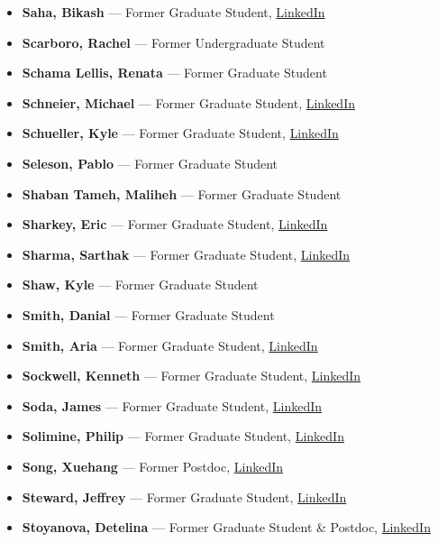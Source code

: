 \documentclass[12pt,a4paper]{article}
\begin{document}
\begin{itemize}
    \item \textbf{Saha, Bikash} --- Former Graduate Student, \href{https://www.linkedin.com/in/bikash-saha-2a3a5530/}{LinkedIn}
    \item \textbf{Scarboro, Rachel} --- Former Undergraduate Student
    \item \textbf{Schama Lellis, Renata} --- Former Graduate Student
    \item \textbf{Schneier, Michael} --- Former Graduate Student, \href{https://www.linkedin.com/in/michael-schneier-51610497/}{LinkedIn}
    \item \textbf{Schueller, Kyle} --- Former Graduate Student, \href{https://www.linkedin.com/in/kyle-schueller-071a9916b/}{LinkedIn}
    \item \textbf{Seleson, Pablo} --- Former Graduate Student
    \item \textbf{Shaban Tameh, Maliheh} --- Former Graduate Student
    \item \textbf{Sharkey, Eric} --- Former Graduate Student, \href{https://www.linkedin.com/in/eric-sharkey-35b80916a/}{LinkedIn}
    \item \textbf{Sharma, Sarthak} --- Former Graduate Student, \href{https://www.linkedin.com/in/sarthak-sharma-636307135/}{LinkedIn}
    \item \textbf{Shaw, Kyle} --- Former Graduate Student
    \item \textbf{Smith, Danial} --- Former Graduate Student
    \item \textbf{Smith, Aria} --- Former Graduate Student, \href{https://www.linkedin.com/in/aria-g-smith-66385a53/}{LinkedIn}
    \item \textbf{Sockwell, Kenneth} --- Former Graduate Student, \href{https://www.linkedin.com/in/kenneth-sockwell-321151a1/}{LinkedIn}
    \item \textbf{Soda, James} --- Former Graduate Student, \href{https://www.linkedin.com/in/james-soda-2a781b83/}{LinkedIn}
    \item \textbf{Solimine, Philip} --- Former Graduate Student, \href{https://www.linkedin.com/in/philip-solimine-02b48995/}{LinkedIn}
    \item \textbf{Song, Xuehang} --- Former Postdoc, \href{https://www.linkedin.com/in/xuehang-song-3037893a/}{LinkedIn}
    \item \textbf{Steward, Jeffrey} --- Former Graduate Student, \href{https://www.linkedin.com/in/jeffrey-steward-66324b10/}{LinkedIn}
    \item \textbf{Stoyanova, Detelina} --- Former Graduate Student \& Postdoc, \href{https://www.linkedin.com/in/detelina-stoyanova-54157833/}{LinkedIn}

\end{itemize}
\end{document}
